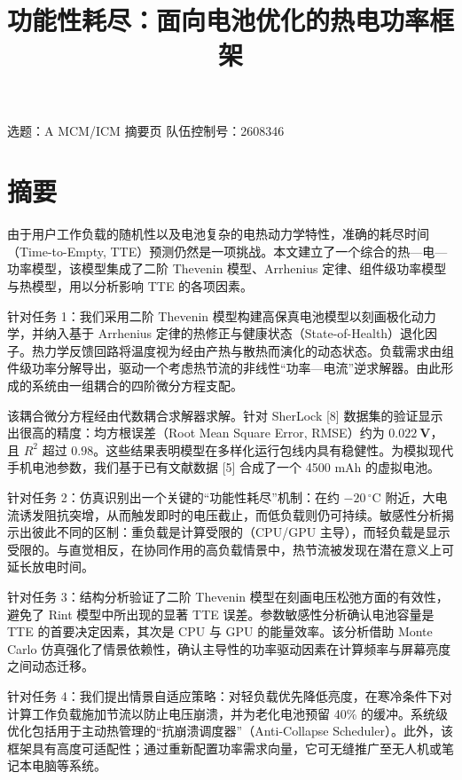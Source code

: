 \documentclass[11pt,a4paper]{ctexart}
\title{功能性耗尽：面向电池优化的热电功率框架}
\author{}
\date{}
\begin{document}
\setlength{\emergencystretch}{3em}
\maketitle

\begin{center}
\small 选题：A  MCM/ICM 摘要页 \quad 队伍控制号：2608346
\end{center}
\vspace{0.5em}

\section*{摘要}

由于用户工作负载的随机性以及电池复杂的电热动力学特性，准确的耗尽时间（Time-to-Empty, TTE）预测仍然是一项挑战。本文建立了一个综合的热—电—功率模型，该模型集成了二阶 Thevenin 模型、Arrhenius 定律、组件级功率模型与热模型，用以分析影响 TTE 的各项因素。

针对任务 1：我们采用二阶 Thevenin 模型构建高保真电池模型以刻画极化动力学，并纳入基于 Arrhenius 定律的热修正与健康状态（State-of-Health）退化因子。热力学反馈回路将温度视为经由产热与散热而演化的动态状态。负载需求由组件级功率分解导出，驱动一个考虑热节流的非线性“功率—电流”逆求解器。由此形成的系统由一组耦合的四阶微分方程支配。

该耦合微分方程经由代数耦合求解器求解。针对 SherLock [8] 数据集的验证显示出很高的精度：均方根误差（Root Mean Square Error, RMSE）约为 $\mathbf{0.022\ V}$，且 $R^2$ 超过 $\mathbf{0.98}$。这些结果表明模型在多样化运行包线内具有稳健性。为模拟现代手机电池参数，我们基于已有文献数据 [5] 合成了一个 4500 mAh 的虚拟电池。

针对任务 2：仿真识别出一个关键的“功能性耗尽”机制：在约 $-20\,^{\circ}\mathrm{C}$ 附近，大电流诱发阻抗突增，从而触发即时的电压截止，而低负载则仍可持续。敏感性分析揭示出彼此不同的区制：重负载是计算受限的（CPU/GPU 主导），而轻负载是显示受限的。与直觉相反，在协同作用的高负载情景中，热节流被发现在潜在意义上可延长放电时间。

针对任务 3：结构分析验证了二阶 Thevenin 模型在刻画电压松弛方面的有效性，避免了 Rint 模型中所出现的显著 TTE 误差。参数敏感性分析确认电池容量是 TTE 的首要决定因素，其次是 CPU 与 GPU 的能量效率。该分析借助 Monte Carlo 仿真强化了情景依赖性，确认主导性的功率驱动因素在计算频率与屏幕亮度之间动态迁移。

针对任务 4：我们提出情景自适应策略：对轻负载优先降低亮度，在寒冷条件下对计算工作负载施加节流以防止电压崩溃，并为老化电池预留 40\% 的缓冲。系统级优化包括用于主动热管理的“抗崩溃调度器”（Anti-Collapse Scheduler）。此外，该框架具有高度可适配性；通过重新配置功率需求向量，它可无缝推广至无人机或笔记本电脑等系统。
\end{document}
